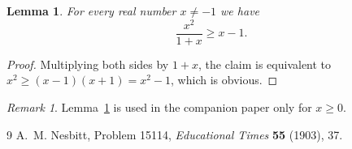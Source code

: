 \documentclass[11pt]{article}
\newtheorem{lemma}[theorem]{Lemma}
\theoremstyle{remark}
\newtheorem{remark}[theorem]{Remark}
\begin{document}
\begin{lemma}\label{lem:quot}
For every real number $x \neq -1$ we have
\[
  \frac{x^2}{1+x} \ge x - 1 .
\]
\end{lemma}

\begin{proof}
Multiplying both sides by $1+x$, the claim is equivalent to
$x^2 \ge (x-1)(x+1) = x^2 - 1$, which is obvious.
\end{proof}

\begin{remark}
Lemma~\ref{lem:quot} is used in the companion paper only for $x \ge 0$.
\end{remark}

\begin{thebibliography}{9}
A.~M. Nesbitt, Problem 15114, \emph{Educational Times} \textbf{55} (1903), 37.
\end{thebibliography}
\end{document}
